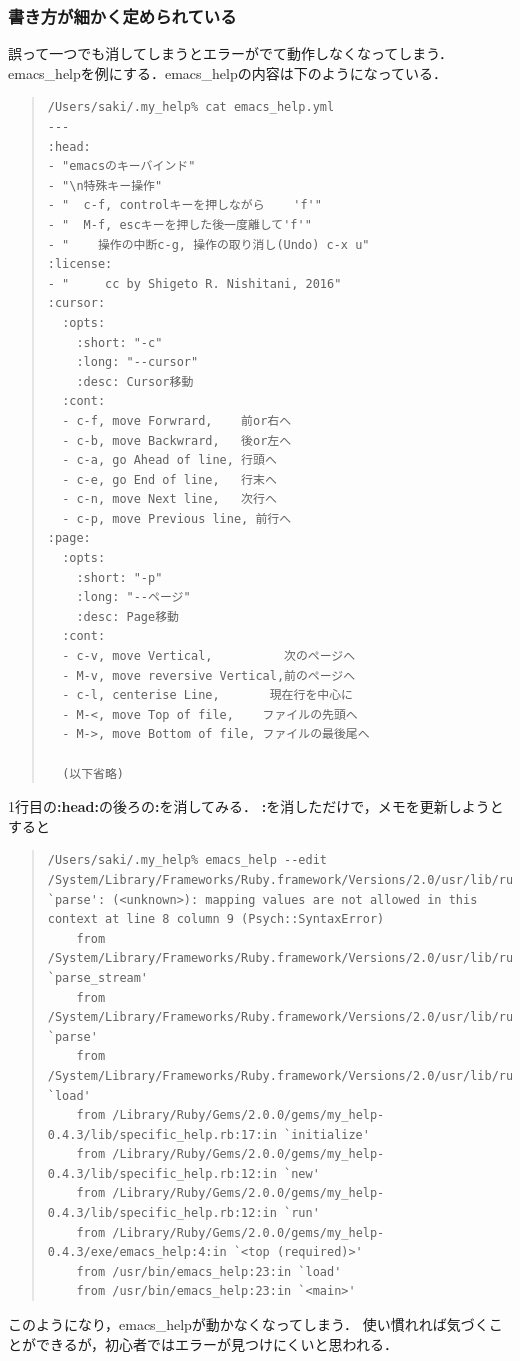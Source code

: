 \subsubsection{書き方が細かく定められている}
誤って一つでも消してしまうとエラーがでて動作しなくなってしまう．
emacs\_helpを例にする．emacs\_helpの内容は下のようになっている．
\begin{quote}\begin{verbatim}
/Users/saki/.my_help% cat emacs_help.yml
---
:head:
- "emacsのキーバインド"
- "\n特殊キー操作"
- "  c-f, controlキーを押しながら    'f'"
- "  M-f, escキーを押した後一度離して'f'"
- "    操作の中断c-g, 操作の取り消し(Undo) c-x u"
:license:
- "     cc by Shigeto R. Nishitani, 2016"
:cursor:
  :opts:
    :short: "-c"
    :long: "--cursor"
    :desc: Cursor移動
  :cont:
  - c-f, move Forwrard,    前or右へ
  - c-b, move Backwrard,   後or左へ
  - c-a, go Ahead of line, 行頭へ
  - c-e, go End of line,   行末へ
  - c-n, move Next line,   次行へ
  - c-p, move Previous line, 前行へ
:page:
  :opts:
    :short: "-p"
    :long: "--ページ"
    :desc: Page移動
  :cont:
  - c-v, move Vertical,          次のページへ
  - M-v, move reversive Vertical,前のページへ
  - c-l, centerise Line,       現在行を中心に
  - M-<, move Top of file,    ファイルの先頭へ
  - M->, move Bottom of file, ファイルの最後尾へ
  
  (以下省略)
\end{verbatim}\end{quote}
1行目の\textbf{:head:}の後ろの\textbf{:}を消してみる．
\textbf{:}を消しただけで，メモを更新しようとすると
\begin{quote}\begin{verbatim}
/Users/saki/.my_help% emacs_help --edit
/System/Library/Frameworks/Ruby.framework/Versions/2.0/usr/lib/ruby/2.0.0/psych.rb:205:in `parse': (<unknown>): mapping values are not allowed in this context at line 8 column 9 (Psych::SyntaxError)
	from /System/Library/Frameworks/Ruby.framework/Versions/2.0/usr/lib/ruby/2.0.0/psych.rb:205:in `parse_stream'
	from /System/Library/Frameworks/Ruby.framework/Versions/2.0/usr/lib/ruby/2.0.0/psych.rb:153:in `parse'
	from /System/Library/Frameworks/Ruby.framework/Versions/2.0/usr/lib/ruby/2.0.0/psych.rb:129:in `load'
	from /Library/Ruby/Gems/2.0.0/gems/my_help-0.4.3/lib/specific_help.rb:17:in `initialize'
	from /Library/Ruby/Gems/2.0.0/gems/my_help-0.4.3/lib/specific_help.rb:12:in `new'
	from /Library/Ruby/Gems/2.0.0/gems/my_help-0.4.3/lib/specific_help.rb:12:in `run'
	from /Library/Ruby/Gems/2.0.0/gems/my_help-0.4.3/exe/emacs_help:4:in `<top (required)>'
	from /usr/bin/emacs_help:23:in `load'
	from /usr/bin/emacs_help:23:in `<main>'
\end{verbatim}\end{quote}
このようになり，emacs\_helpが動かなくなってしまう．
使い慣れれば気づくことができるが，初心者ではエラーが見つけにくいと思われる．

